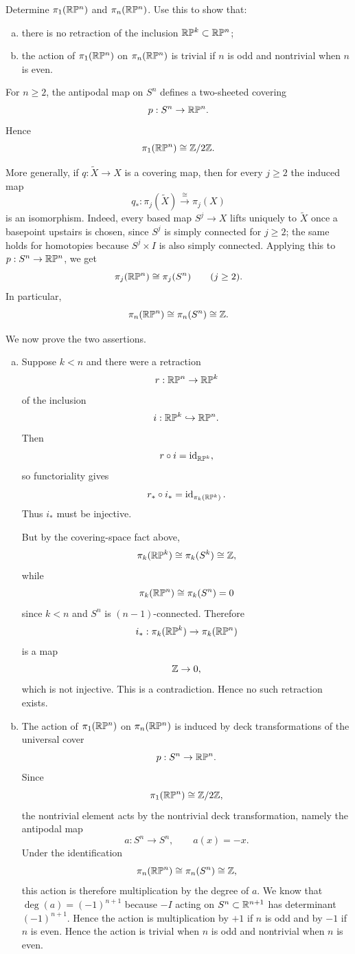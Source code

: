 \documentclass[12pt]{article}
\begin{document}
\begin{problem}[3]
Determine $\pi_1(\mathbb{R}\mathbb{P}^n)$ and $\pi_n(\mathbb{R}\mathbb{P}^n)$. Use this to show that:
\begin{enumerate}[(a)]
    \item there is no retraction of the inclusion $\mathbb{R}\mathbb{P}^k \subset \mathbb{R}\mathbb{P}^n$;
    \item the action of $\pi_1(\mathbb{R}\mathbb{P}^n)$ on $\pi_n(\mathbb{R}\mathbb{P}^n)$ is trivial if $n$ is odd and nontrivial when $n$ is even.
\end{enumerate}
\end{problem}
\begin{solution}
For $n\ge 2$, the antipodal map on $S^n$ defines a two-sheeted covering
\[
p:S^n\to \mathbb{R}\mathbb{P}^n.
\]
Hence
\[
\pi_1(\mathbb{R}\mathbb{P}^n)\cong \mathbb{Z}/2\mathbb{Z}.
\]

More generally, if $q:\widetilde X\to X$ is a covering map, then for every $j\ge 2$ the induced map
\[
q_*:\pi_j(\widetilde X)\xrightarrow{\ \cong\ }\pi_j(X)
\]
is an isomorphism. Indeed, every based map $S^j\to X$ lifts uniquely to $\widetilde X$ once a basepoint upstairs is chosen, since $S^j$ is simply connected for $j\ge 2$; the same holds for homotopies because $S^j\times I$ is also simply connected. Applying this to $p:S^n\to \mathbb{R}\mathbb{P}^n$, we get
\[
\pi_j(\mathbb{R}\mathbb{P}^n)\cong \pi_j(S^n)\qquad (j\ge 2).
\]
In particular,
\[
\pi_n(\mathbb{R}\mathbb{P}^n)\cong \pi_n(S^n)\cong \mathbb{Z}.
\]

We now prove the two assertions.

\begin{enumerate}[(a)]
    \item Suppose $k<n$ and there were a retraction
    \[
    r:\mathbb{R}\mathbb{P}^n\to \mathbb{R}\mathbb{P}^k
    \]
    of the inclusion
    \[
    i:\mathbb{R}\mathbb{P}^k\hookrightarrow \mathbb{R}\mathbb{P}^n.
    \]
    Then
    \[
    r\circ i=\operatorname{id}_{\mathbb{R}\mathbb{P}^k},
    \]
    so functoriality gives
    \[
    r_*\circ i_*=\operatorname{id}_{\pi_k(\mathbb{R}\mathbb{P}^k)}.
    \]
    Thus $i_*$ must be injective.

    But by the covering-space fact above,
    \[
    \pi_k(\mathbb{R}\mathbb{P}^k)\cong \pi_k(S^k)\cong \mathbb{Z},
    \]
    while
    \[
    \pi_k(\mathbb{R}\mathbb{P}^n)\cong \pi_k(S^n)=0
    \]
    since $k<n$ and $S^n$ is $(n-1)$-connected. Therefore
    \[
    i_*:\pi_k(\mathbb{R}\mathbb{P}^k)\to \pi_k(\mathbb{R}\mathbb{P}^n)
    \]
    is a map
    \[
    \mathbb{Z}\to 0,
    \]
    which is not injective. This is a contradiction. Hence no such retraction exists.

    \item The action of $\pi_1(\mathbb{R}\mathbb{P}^n)$ on $\pi_n(\mathbb{R}\mathbb{P}^n)$ is induced by deck transformations of the universal cover
    \[
    p:S^n\to \mathbb{R}\mathbb{P}^n.
    \]
    Since
    \[
    \pi_1(\mathbb{R}\mathbb{P}^n)\cong \mathbb{Z}/2\mathbb{Z},
    \]
    the nontrivial element acts by the nontrivial deck transformation, namely the antipodal map
    \[
    a:S^n\to S^n,\qquad a(x)=-x.
    \]
    Under the identification
    \[
    \pi_n(\mathbb{R}\mathbb{P}^n)\cong \pi_n(S^n)\cong \mathbb{Z},
    \]
    this action is therefore multiplication by the degree of $a$. We know that $\deg(a)=(-1)^{n+1}$ because $-I$ acting on $S^n \subset \mathbb{R}^{n+1}$ has determinant $(-1)^{n+1}$. Hence the action is multiplication by $+1$ if $n$ is odd and by $-1$ if $n$ is even. Hence the action is trivial when $n$ is odd and nontrivial when $n$ is even.
\end{enumerate}
\end{solution}
\end{document}
